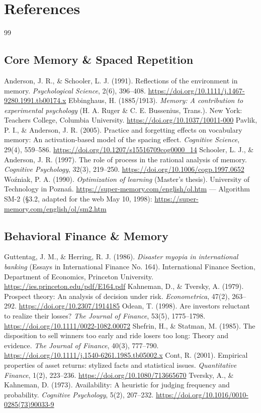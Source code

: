 \documentclass[11pt]{article}
\begin{document}
\section{References}
\begin{thebibliography}{99}
\subsection{Core Memory \& Spaced Repetition}
 Anderson, J. R., \& Schooler, L. J. (1991). Reflections of the environment in memory. \textit{Psychological Science}, 2(6), 396--408. \url{https://doi.org/10.1111/j.1467-9280.1991.tb00174.x}
 Ebbinghaus, H. (1885/1913). \textit{Memory: A contribution to experimental psychology} (H. A. Ruger \& C. E. Bussenius, Trans.). New York: Teachers College, Columbia University. \url{https://doi.org/10.1037/10011-000}
 Pavlik, P. I., \& Anderson, J. R. (2005). Practice and forgetting effects on vocabulary memory: An activation-based model of the spacing effect. \textit{Cognitive Science}, 29(4), 559--586. \url{https://doi.org/10.1207/s15516709cog0000_14}
 Schooler, L. J., \& Anderson, J. R. (1997). The role of process in the rational analysis of memory. \textit{Cognitive Psychology}, 32(3), 219--250. \url{https://doi.org/10.1006/cogp.1997.0652}
 Woźniak, P. A. (1990). \textit{Optimization of learning} (Master's thesis). University of Technology in Poznań. \url{https://super-memory.com/english/ol.htm} --- Algorithm SM-2 (\S3.2, adapted for the web May 10, 1998): \url{https://super-memory.com/english/ol/sm2.htm}
\subsection{Behavioral Finance \& Memory}
 Guttentag, J. M., \& Herring, R. J. (1986). \textit{Disaster myopia in international banking} (Essays in International Finance No. 164). International Finance Section, Department of Economics, Princeton University. \url{https://ies.princeton.edu/pdf/E164.pdf}
 Kahneman, D., \& Tversky, A. (1979). Prospect theory: An analysis of decision under risk. \textit{Econometrica}, 47(2), 263--292. \url{https://doi.org/10.2307/1914185}
 Odean, T. (1998). Are investors reluctant to realize their losses? \textit{The Journal of Finance}, 53(5), 1775--1798. \url{https://doi.org/10.1111/0022-1082.00072}
 Shefrin, H., \& Statman, M. (1985). The disposition to sell winners too early and ride losers too long: Theory and evidence. \textit{The Journal of Finance}, 40(3), 777--790. \url{https://doi.org/10.1111/j.1540-6261.1985.tb05002.x}
 Cont, R. (2001). Empirical properties of asset returns: stylized facts and statistical issues. \textit{Quantitative Finance}, 1(2), 223--236. \url{https://doi.org/10.1080/713665670}
 Tversky, A., \& Kahneman, D. (1973). Availability: A heuristic for judging frequency and probability. \textit{Cognitive Psychology}, 5(2), 207--232. \url{https://doi.org/10.1016/0010-0285(73)90033-9}

\end{thebibliography}
\end{document}
